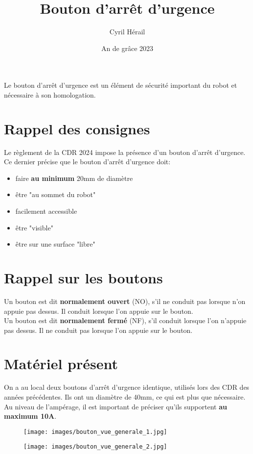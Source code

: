 \documentclass{article}
\title{Bouton d'arrêt d'urgence}
\author{Cyril Hérail}
\date{An de grâce 2023}
\begin{document}
\maketitle

 Le bouton d'arrêt d'urgence est un élément de sécurité important du robot et nécessaire à son homologation. 

\section*{Rappel des consignes}

Le règlement de la CDR 2024 impose la présence d'un bouton d'arrêt d'urgence. Ce dernier précise que le bouton d'arrêt d'urgence doit:

\begin{itemize}
    \item faire \textbf{au minimum} 20mm de diamètre
    \item être "au sommet du robot"
    \item facilement accessible
    \item être "visible"
    \item être sur une surface "libre"
\end{itemize} 

\section*{Rappel sur les boutons}

Un bouton est dit \textbf{normalement ouvert} (NO), s'il ne conduit pas lorsque n'on appuie pas dessus. Il conduit lorsque l'on appuie sur le bouton. \\
Un bouton est dit \textbf{normalement fermé} (NF), s'il conduit lorsque l'on n'appuie pas dessus. Il ne conduit pas lorsque l'on appuie sur le bouton.

\section*{Matériel présent}

On a au local deux boutons d'arrêt d'urgence identique, utilisés lors des CDR des années précédentes. Ils ont un diamètre de 40mm, ce qui est plus que nécessaire. Au niveau de l'ampérage, il est important de préciser qu'ils supportent \textbf{au maximum 10A}. \\

\begin{figure}[h]
    \begin{minipage}{0.45\textwidth}
        \centering
        \texttt{[image: images/bouton\_vue\_generale\_1.jpg]}
        \captionsetup{labelformat=empty}
        \caption{}
        \label{fig:image1}
    \end{minipage}
    \hfill
    \begin{minipage}{0.45\textwidth}
        \centering
        \texttt{[image: images/bouton\_vue\_generale\_2.jpg]}
        \captionsetup{labelformat=empty}
        \caption{}
        \label{fig:image2}
    \end{minipage}
\end{figure}
\end{document}
